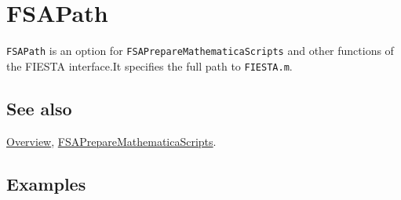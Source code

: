 \documentclass[../FeynHelpersManual.tex]{subfiles}
\begin{document}
\begin{Shaded}
\begin{Highlighting}[]
 
\end{Highlighting}
\end{Shaded}

\hypertarget{fsapath}{
\section{FSAPath}\label{fsapath}}

\texttt{FSAPath} is an option for \texttt{FSAPrepareMathematicaScripts}
and other functions of the FIESTA interface.It specifies the full path
to \texttt{FIESTA.m}.

\subsection{See also}

\hyperlink{toc}{Overview},
\hyperlink{fsapreparemathematicascripts}{FSAPrepareMathematicaScripts}.

\subsection{Examples}
\end{document}
